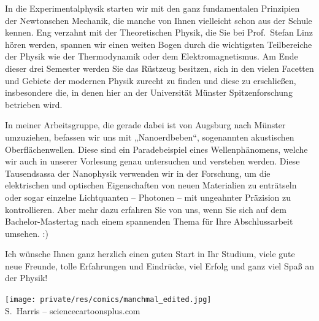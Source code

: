 \begin{multicols}{2}
In die Experimentalphysik starten wir mit den ganz fundamentalen Prinzipien der Newtonschen Mechanik, die manche von Ihnen vielleicht schon aus der Schule kennen. Eng verzahnt mit der Theoretischen Physik, die Sie bei Prof.\ Stefan Linz hören werden, spannen wir einen weiten Bogen durch die wichtigsten Teilbereiche der Physik wie der Thermodynamik oder dem Elektromagnetismus. Am Ende dieser drei Semester werden Sie das Rüstzeug besitzen, sich in den vielen Facetten und Gebiete der modernen Physik zurecht zu finden und diese zu erschließen, insbesondere die, in denen hier an der Universität Münster Spitzenforschung betrieben wird.

In meiner Arbeitsgruppe, die gerade dabei ist von Augsburg nach Münster umzuziehen, befassen wir uns mit „Nanoerdbeben“, sogenannten akustischen Oberflächenwellen. Diese sind ein Paradebeispiel eines Wellenphänomens, welche wir auch in unserer Vorlesung genau untersuchen und verstehen werden. Diese Tausendsassa der Nanophysik verwenden wir in der Forschung, um die elektrischen und optischen Eigenschaften von neuen Materialien zu enträtseln oder sogar einzelne Lichtquanten -- Photonen -- mit ungeahnter Präzision zu kontrollieren. Aber mehr dazu erfahren Sie von uns, wenn Sie sich auf dem Bachelor-Mastertag nach einem spannenden Thema für Ihre Abschlussarbeit umsehen. :)

Ich wünsche Ihnen ganz herzlich einen guten Start in Ihr Studium, viele gute neue Freunde, tolle Erfahrungen und Eindrücke, viel Erfolg und ganz viel Spaß an der Physik!

\begin{center}
\texttt{[image: private/res/comics/manchmal\_edited.jpg]}\\
{\footnotesize 
S.~Harris – sciencecartoonsplus.com}
\end{center}

\end{multicols}

\vfill

\newpage

